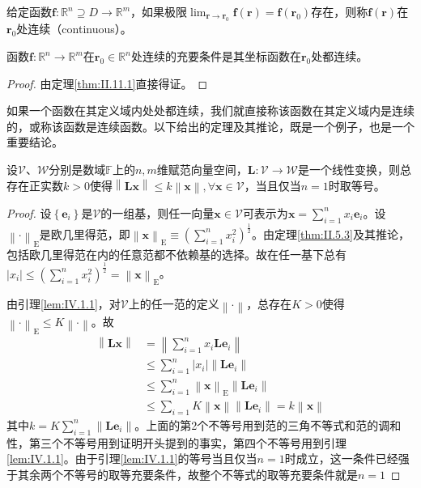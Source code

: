 \documentclass[main.tex]{subfiles}
\begin{document}
\begin{definition}[函数的连续性]\label{II.11.2}
给定函数$\mathbf{f}:\mathbb{R}^n\supseteq D\rightarrow\mathbb{R}^m$，如果极限$\lim_{\mathbf{r}\to\mathbf{r}_0}\mathbf{f}\left(\mathbf{r}\right)=\mathbf{f}\left(\mathbf{r}_0\right)$存在，则称$\mathbf{f}\left(\mathbf{r}\right)$在$\mathbf{r}_0$处连续（continuous）。
\end{definition}

\begin{theorem}\label{thm:II.11.2}
函数$\mathbf{f}:\mathbb{R}^n\rightarrow\mathbb{R}^m$在$\mathbf{r}_0\in\mathbb{R}^n$处连续的充要条件是其坐标函数在$\mathbf{r}_0$处都连续。
\end{theorem}
\begin{proof}
由定理\ref{thm:II.11.1}直接得证。
\end{proof}

如果一个函数在其定义域内处处都连续，我们就直接称该函数在其定义域内是连续的，或称该函数是连续函数。以下给出的定理及其推论，既是一个例子，也是一个重要结论。

\begin{theorem}\label{thm:II.11.3}
设$\mathcal{V}$、$\mathcal{W}$分别是数域$\mathbb{F}$上的$n,m$维赋范向量空间，$\mathbf{L}:\mathcal{V}\rightarrow\mathcal{W}$是一个线性变换，则总存在正实数$k>0$使得$\left\|\mathbf{Lx}\right\|\leq k\left\|\mathbf{x}\right\|,\forall\mathbf{x}\in\mathcal{V}$，当且仅当$n=1$时取等号。
\end{theorem}
\begin{proof}
设$\left\{\mathbf{e}_i\right\}$是$\mathcal{V}$的一组基，则任一向量$\mathbf{x}\in\mathcal{V}$可表示为$\mathbf{x}=\sum_{i=1}^nx_i\mathbf{e}_i$。设$\left\|\cdot\right\|_\mathrm{E}$是欧几里得范，即$\left\|\mathbf{x}\right\|_\mathrm{E}\equiv\left(\sum_{i=1}^nx_i^2\right)^\frac{1}{2}$。由定理\ref{thm:II.5.3}及其推论，包括欧几里得范在内的任意范都不依赖基的选择。故在任一基下总有$\left|x_i\right|\leq\left(\sum_{i=1}^nx_i^2\right)^\frac{1}{2}=\left\|\mathbf{x}\right\|_\mathrm{E}$。

由引理\ref{lem:IV.1.1}，对$\mathcal{V}$上的任一范的定义$\left\|\cdot\right\|$，总存在$K>0$使得$\left\|\cdot\right\|_\mathrm{E}\leq K\left\|\cdot\right\|$。故
\begin{align*}
    \left\|\mathbf{Lx}\right\|&=\left\|\sum_{i=1}^nx_i\mathbf{Le}_i\right\|\\
    &\leq\sum_{i=1}^n\left|x_i\right|\left\|\mathbf{Le}_i\right\|\\
    &\leq\sum_{i=1}^n\left\|\mathbf{x}\right\|_\mathrm{E}\left\|\mathbf{Le}_i\right\|\\
    &\leq\sum_{i=1} K\left\|\mathbf{x}\right\|\left\|\mathbf{Le}_i\right\|=k\left\|\mathbf{x}\right\|
\end{align*}
其中$k=K\sum_{i=1}^n\left\|\mathbf{Le}_i\right\|$。上面的第2个不等号用到范的三角不等式和范的调和性，第三个不等号用到证明开头提到的事实，第四个不等号用到引理\ref{lem:IV.1.1}。由于引理\ref{lem:IV.1.1}的等号当且仅当$n=1$时成立，这一条件已经强于其余两个不等号的取等充要条件，故整个不等式的取等充要条件就是$n=1$
\end{proof}
\end{document}
